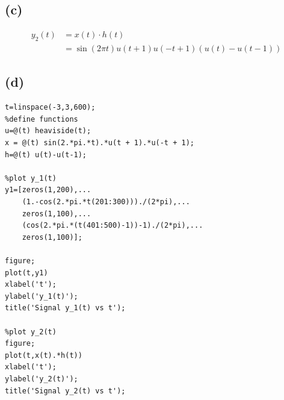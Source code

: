 \documentclass[12pt]{article}
\begin{document}
\subsection*{(c)}
\begin{align*}
y_2(t)&=x(t)\cdot h(t)\\
&=\boxed{\sin(2\pi t)u(t+1)u(-t+1)(u(t)-u(t-1))}
\end{align*}
\subsection*{(d)}
\begin{lstlisting}
t=linspace(-3,3,600);
%define functions
u=@(t) heaviside(t);
x = @(t) sin(2.*pi.*t).*u(t + 1).*u(-t + 1);
h=@(t) u(t)-u(t-1);

%plot y_1(t)
y1=[zeros(1,200),...
    (1.-cos(2.*pi.*t(201:300)))./(2*pi),...
    zeros(1,100),...
    (cos(2.*pi.*(t(401:500)-1))-1)./(2*pi),...
    zeros(1,100)];

figure;
plot(t,y1)
xlabel('t');
ylabel('y_1(t)');
title('Signal y_1(t) vs t');

%plot y_2(t)
figure;
plot(t,x(t).*h(t))
xlabel('t');
ylabel('y_2(t)');
title('Signal y_2(t) vs t');
\end{lstlisting}
\end{document}
